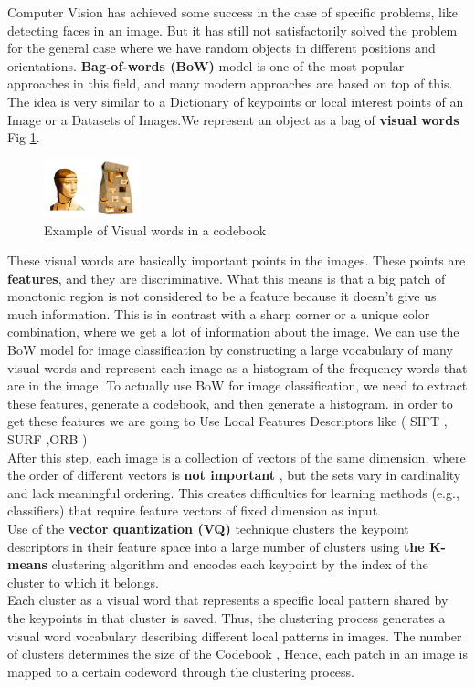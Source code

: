 Computer Vision has achieved some success in the case of specific problems, like detecting faces in an image. But it has still not satisfactorily solved the problem for the general case where we have random objects in different positions and orientations. \textbf{Bag-of-words (BoW) } model is one of the most popular approaches in this field, and many modern approaches are based on top of this.
The idea is very similar to a Dictionary of keypoints or local interest points of an Image or a Datasets of Images.We represent an object as a bag of \textbf{visual words} Fig \ref{fig:coodbook}.\\
\begin{figure}
\includegraphics[width=0.25\textwidth]{img/codebook.jpg}
\caption{Example of Visual words in a codebook}
\label{fig:coodbook}
\end{figure}
These visual words are basically important points in the images. These points are \textbf{features}, and they are discriminative. What this means is that a big patch of monotonic region is not considered to be a feature because it doesn’t give us much information. This is in contrast with a sharp corner or a unique color combination, where we get a lot of information about the image. We can use the BoW model for image classification by constructing a large vocabulary of many visual words and represent each image as a histogram of the frequency words that are in the image. To actually use BoW for image classification, we need to extract these features, generate a codebook, and then generate a histogram. in order to get these features we are going to Use Local Features Descriptors like ( SIFT , SURF ,ORB )\\
After this step, each image is a collection of vectors of the same dimension, where the order of different vectors is\textbf{ not important} , but the sets vary in cardinality and lack meaningful ordering. This creates difficulties for learning methods (e.g., classifiers) that require feature vectors of fixed dimension as input.\\ Use of the \textbf{vector quantization (VQ)} technique clusters the keypoint descriptors in their feature space into a large number of clusters using \textbf{the K-means } clustering algorithm and encodes each keypoint by the index of the cluster to which it belongs.\\ Each cluster as a visual word that represents a specific local pattern shared by the keypoints in that cluster is saved. Thus, the clustering process generates a visual word vocabulary describing different local patterns in images. The number of clusters determines the size of the Codebook , Hence, each patch in an image is mapped to a certain codeword through the clustering process.



